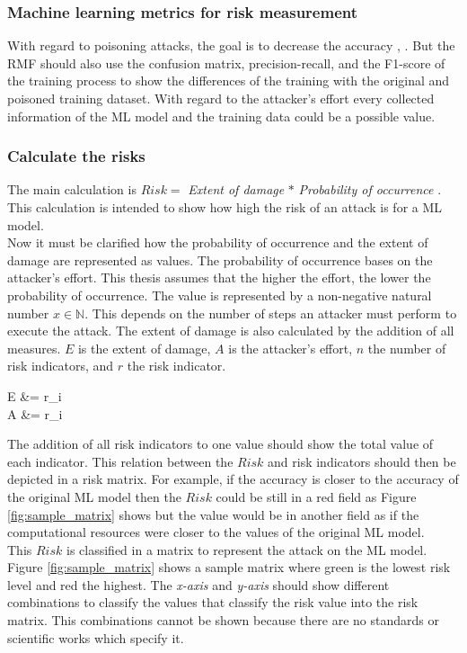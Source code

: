 \subsubsection*{Machine learning metrics for risk measurement}

With regard to poisoning attacks, the goal is to decrease the accuracy \cite{DBLP:conf/icml/BiggioNL12}, \cite{DBLP:journals/corr/abs-1708-06733}. But the RMF should also use the confusion matrix, precision-recall, and the F1-score of the training process to show the differences of the training with the original and poisoned training dataset. With regard to the attacker's effort every collected information of the ML model and the training data could be a possible value.

\subsubsection*{Calculate the risks}

The main calculation is $Risk = $ \textit{Extent of damage} $*$ \textit{Probability of occurrence} \cite{DBLP:journals/access/JianxingHSH21}. This calculation is intended to show how high the risk of an attack is for a ML model. \\
Now it must be clarified how the probability of occurrence and the extent of damage are represented as values. The probability of occurrence bases on the attacker's effort. This thesis assumes that the higher the effort, the lower the probability of occurrence. The value is represented by a non-negative natural number $x \in \mathbb{N}$. This depends on the number of steps an attacker must perform to execute the attack. The extent of damage is also calculated by the addition of all measures. $E$ is the extent of damage, $A$ is the attacker's effort, $n$ the number of risk indicators, and $r$ the risk indicator. \\

\begin{center}
  E &=  r_{i} \\
  A &=  r_{i} \\
\end{center}

The addition of all risk indicators to one value should show the total value of each indicator. This relation between the $Risk$ and risk indicators should then be depicted in a risk matrix. For example, if the accuracy is closer to the accuracy of the original ML model then the $Risk$ could be still in a red field as Figure \ref{fig:sample_matrix} shows but the value would be in another field as if the computational resources were closer to the values of the original ML model. \\
This $Risk$ is classified in a matrix to represent the attack on the ML model. Figure \ref{fig:sample_matrix} shows a sample matrix where green is the lowest risk level and red the highest. The \textit{x-axis} and \textit{y-axis} should show different combinations to classify the values that classify the risk value into the risk matrix. This combinations cannot be shown because there are no standards or scientific works which specify it.

